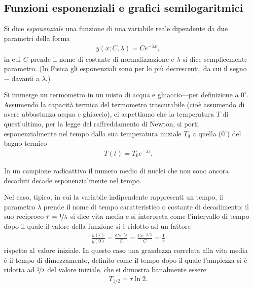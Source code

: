\subsection{Funzioni esponenziali e grafici semilogaritmici}
\label{subsec:semilog}

Si dice \emph{esponenziale} una funzione di una variabile reale dipendente da
due parametri della forma
\begin{align}\label{eq:esponenziale}
  y(x; C, \lambda) = Ce^{-\lambda x},
\end{align}
in cui $C$ prende il nome di costante di normalizzazione e $\lambda$ si dice
semplicemente parametro. (In Fisica gli esponenziali sono per lo pi\`u decrescenti,
da cui il segno $-$ davanti a $\lambda$.)

\begin{examplebox}
  \begin{example}\label{exp:legge_di_newton}
    Si immerge un termometro in un misto di acqua e ghiaccio---per definizione a
    $0^\circ$. Assumendo la capacità termica del termometro trascurabile
    (cioè assumendo di avere abbastanza acqua e ghiaccio), ci aspettiamo che
    la temperatura $T$ di quest'ultimo, per la legge del raffreddamento di
    Newton, si porti esponenzialmente nel tempo dalla sua temperatura iniziale
    $T_0$ a quella ($0^\circ$) del bagno termico
    \begin{align*}
      T(t) = T_0 e^{-\lambda t}.
    \end{align*}
  \end{example}

  \begin{example}
    In un campione radioattivo il numero medio di nuclei che non sono ancora decaduti
    decade esponenzialmente nel tempo.
  \end{example}
\end{examplebox}

Nel caso, tipico, in cui la variabile indipendente rappresenti un tempo, il parametro
$\lambda$ prende il nome di tempo caratteristico o costante di decadimento; il suo
reciproco $\tau = \nicefrac{1}{\lambda}$ si dice vita media e si interpreta come
l'intervallo di tempo dopo il quale il valore della funzione si è ridotto ad un fattore
\begin{align}\label{eq:exp_decay_mean_lifetime}
  \frac{y(\tau)}{y(0)} = \frac{Ce^{-\lambda \tau}}{C} =
  \frac{Ce^{-\lambda/\lambda}}{C} = \frac{1}{e}
\end{align}
rispetto al valore iniziale. In questo caso una grandezza correlata alla vita media è il
tempo di dimezzamento, definito come il tempo dopo il quale l'ampiezza si è ridotta
ad $\nicefrac{1}{2}$ del valore iniziale, che si dimostra banalmente essere
\begin{align}\label{eq:exp_decay_half_life}
  T_{1/2} = \tau\ln2.
\end{align}

